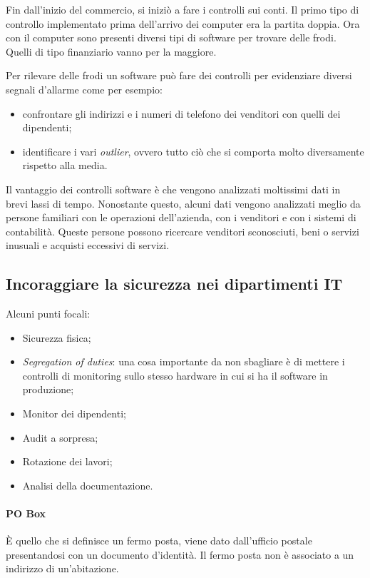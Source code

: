 Fin dall'inizio del commercio, si iniziò a fare i controlli sui conti. Il
primo tipo di controllo implementato prima dell'arrivo dei computer era la
partita doppia. Ora con il computer sono presenti diversi tipi di software
per trovare delle frodi. Quelli di tipo finanziario vanno per la maggiore.



Per rilevare delle frodi un software può fare dei controlli 
per evidenziare diversi segnali d'allarme come per esempio:
\begin{itemize}
\item confrontare gli indirizzi e i numeri di telefono dei venditori con
quelli dei dipendenti;
\item identificare i vari \textit{outlier}, ovvero tutto ciò che si
comporta molto diversamente rispetto alla media.
\end{itemize}
Il vantaggio dei controlli software è che vengono analizzati moltissimi
dati in brevi lassi di tempo. Nonostante questo, alcuni dati vengono 
analizzati meglio da persone familiari con le operazioni dell'azienda,
con i venditori e con i sistemi di contabilità. 
Queste persone possono ricercare venditori sconosciuti, beni o servizi
inusuali e acquisti eccessivi di servizi.


\subsection{Incoraggiare la sicurezza nei dipartimenti IT}

Alcuni punti focali:
\begin{itemize}
  \item Sicurezza fisica;
  \item \textit{Segregation of duties}: una cosa importante da non sbagliare è di mettere i controlli di monitoring
  sullo stesso hardware in cui si ha il software in produzione;
  \item Monitor dei dipendenti;
  \item Audit a sorpresa;
  \item Rotazione dei lavori;
  \item Analisi della documentazione.
\end{itemize}

\paragraph*{PO Box}

È quello che si definisce un fermo posta, viene dato dall'ufficio postale
presentandosi con un documento d'identità. Il fermo posta non è associato a un
indirizzo di un'abitazione.

